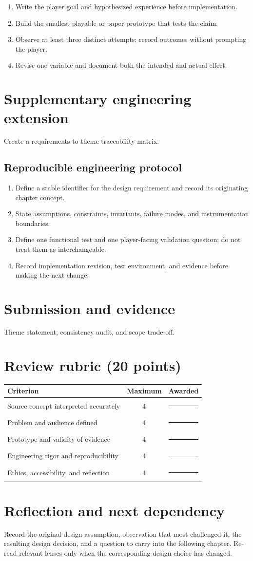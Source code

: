 \documentclass[11pt]{article}
\begin{document}
\begin{enumerate}
\item Write the player goal and hypothesized experience before implementation.
\item Build the smallest playable or paper prototype that tests the claim.
\item Observe at least three distinct attempts; record outcomes without prompting the player.
\item Revise one variable and document both the intended and actual effect.
\end{enumerate}

\section{Supplementary engineering extension}
Create a requirements-to-theme traceability matrix.


\subsection{Reproducible engineering protocol}
\begin{enumerate}
\item Define a stable identifier for the design requirement and record its originating chapter concept.
\item State assumptions, constraints, invariants, failure modes, and instrumentation boundaries.
\item Define one functional test and one player-facing validation question; do not treat them as interchangeable.
\item Record implementation revision, test environment, and evidence before making the next change.
\end{enumerate}

\section{Submission and evidence}
Theme statement, consistency audit, and scope trade-off.


\section{Review rubric (20 points)}
\begin{tabularx}{\linewidth}{@{}Xcc@{}}\toprule
Criterion & Maximum & Awarded \\ \midrule
Source concept interpreted accurately & 4 & \rule{0.45in}{0.4pt}\\
Problem and audience defined & 4 & \rule{0.45in}{0.4pt}\\
Prototype and validity of evidence & 4 & \rule{0.45in}{0.4pt}\\
Engineering rigor and reproducibility & 4 & \rule{0.45in}{0.4pt}\\
Ethics, accessibility, and reflection & 4 & \rule{0.45in}{0.4pt}\\\bottomrule
\end{tabularx}

\section{Reflection and next dependency}
Record the original design assumption, observation that most challenged it, the resulting design decision, and a question to carry into the following chapter. Re-read relevant lenses only when the corresponding design choice has changed.
\end{document}
